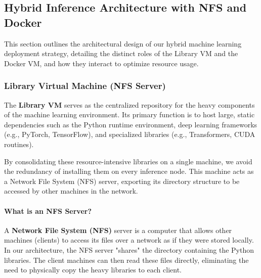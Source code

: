 \documentclass[10pt,a4paper,twocolumn]{article}
\begin{document}

\subsection{Hybrid Inference Architecture with NFS and Docker}

This section outlines the architectural design of our hybrid machine learning deployment strategy, detailing the distinct roles of the Library VM and the Docker VM, and how they interact to optimize resource usage.

\subsubsection{Library Virtual Machine (NFS Server)}

The \textbf{Library VM} serves as the centralized repository for the heavy components of the machine learning environment. Its primary function is to host large, static dependencies such as the Python runtime environment, deep learning frameworks (e.g., PyTorch, TensorFlow), and specialized libraries (e.g., Transformers, CUDA routines).

By consolidating these resource-intensive libraries on a single machine, we avoid the redundancy of installing them on every inference node. This machine acts as a Network File System (NFS) server, exporting its directory structure to be accessed by other machines in the network.

\paragraph{What is an NFS Server?}

A \textbf{Network File System (NFS)} server is a computer that allows other machines (clients) to access its files over a network as if they were stored locally. In our architecture, the NFS server "shares" the directory containing the Python libraries. The client machines can then read these files directly, eliminating the need to physically copy the heavy libraries to each client.
\end{document}
